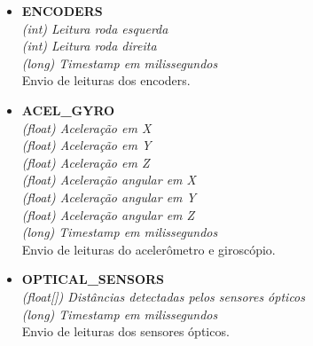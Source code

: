\begin{itemize}
\begin{itemize}
      \item \textbf{ENCODERS} \\
	\textit{(int) Leitura roda esquerda }\\
	\textit{(int) Leitura roda direita }\\
	\textit{(long) Timestamp em milissegundos}\\
	Envio de leituras dos encoders.

      \item \textbf{ACEL\_GYRO} \\
	\textit{(float) Aceleração em X }\\
	\textit{(float) Aceleração em Y }\\
	\textit{(float) Aceleração em Z }\\
	\textit{(float) Aceleração angular em X }\\
	\textit{(float) Aceleração angular em Y }\\
	\textit{(float) Aceleração angular em Z }\\
	\textit{(long) Timestamp em milissegundos}\\
	Envio de leituras do acelerômetro e giroscópio.

      \item \textbf{OPTICAL\_SENSORS} \\
	\textit{(float[]) Distâncias detectadas pelos sensores ópticos} \\
	\textit{(long) Timestamp em milissegundos}\\
	Envio de leituras dos sensores ópticos.

    \end{itemize}
\end{itemize}
